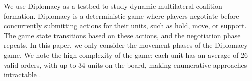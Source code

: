 We use Diplomacy as a testbed to study dynamic multilateral coalition formation. 
Diplomacy is a deterministic game where players negotiate before concurrently submitting actions for their units, such as hold, move, or support.
The game state transitions based on these actions, and the negotiation phase repeats.
In this paper, we only consider the movement phases of the Diplomacy game. 
We note the high complexity of the game: each unit has an average of 26 valid orders, with up to 34 units on the board, making enumerative approaches intractable \citep{bakhtin2021no}.



 

